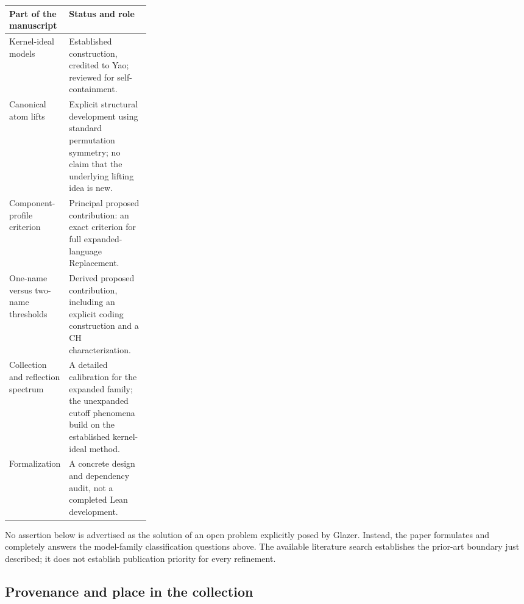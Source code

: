 \documentclass[11pt,letterpaper]{article}
\numberwithin{equation}{section}
\theoremstyle{plain}
\theoremstyle{definition}
\theoremstyle{remark}
\begin{document}
\begin{center}
\begin{tabularx}{\linewidth}{@{}L{0.27\linewidth}Y@{}}
\toprule
Part of the manuscript & Status and role\\
\midrule
Kernel-ideal models & Established construction, credited to Yao; reviewed for self-containment.\\
Canonical atom lifts & Explicit structural development using standard permutation symmetry; no claim that the underlying lifting idea is new.\\
Component-profile criterion & Principal proposed contribution: an exact criterion for full expanded-language Replacement.\\
One-name versus two-name thresholds & Derived proposed contribution, including an explicit coding construction and a CH characterization.\\
Collection and reflection spectrum & A detailed calibration for the expanded family; the unexpanded cutoff phenomena build on the established kernel-ideal method.\\
Formalization & A concrete design and dependency audit, not a completed Lean development.\\
\bottomrule
\end{tabularx}
\end{center}

No assertion below is advertised as the solution of an open problem explicitly posed by Glazer. Instead, the paper formulates and completely answers the model-family classification questions above. The available literature search establishes the prior-art boundary just described; it does not establish publication priority for every refinement.

\subsection{Provenance and place in the collection}
\label{nee:sec:provenance}
\end{document}
